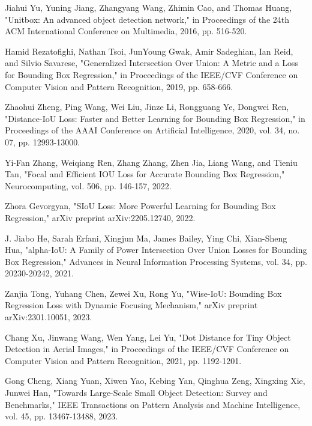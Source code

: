 \documentclass[lettersize,journal]{IEEEtran}
\begin{document}
\begin{thebibliography}{99}


 Jiahui Yu, Yuning Jiang, Zhangyang Wang, Zhimin Cao, and Thomas
Huang, "Unitbox: An advanced object detection network," in Proceedings of the 24th ACM International Conference on Multimedia, 2016, pp. 516-520.

Hamid Rezatofighi, Nathan Tsoi, JunYoung Gwak, Amir Sadeghian, Ian
Reid, and Silvio Savarese, "Generalized Intersection Over Union: A Metric and a Loss for Bounding Box Regression," in Proceedings of the IEEE/CVF Conference on Computer Vision and Pattern Recognition, 2019, pp. 658-666.

Zhaohui Zheng, Ping Wang, Wei Liu, Jinze Li, Rongguang Ye, Dongwei Ren, "Distance-IoU Loss: Faster and Better Learning for Bounding Box Regression," in Proceedings of the AAAI Conference on Artificial Intelligence, 2020, vol. 34, no. 07, pp. 12993-13000.

Yi-Fan Zhang, Weiqiang Ren, Zhang Zhang, Zhen Jia, Liang Wang,
and Tieniu Tan, "Focal and Efficient IOU Loss for Accurate Bounding Box Regression," Neurocomputing, vol. 506, pp. 146-157, 2022.

Zhora Gevorgyan, "SIoU Loss: More Powerful Learning for Bounding Box Regression," arXiv preprint arXiv:2205.12740, 2022.

J. Jiabo He, Sarah Erfani, Xingjun Ma, James Bailey, Ying Chi, Xian-Sheng Hua, "alpha-IoU: A Family of Power Intersection Over Union Losses for Bounding Box Regression," Advances in Neural Information Processing Systems, vol. 34, pp. 20230-20242, 2021.

Zanjia Tong, Yuhang Chen, Zewei Xu, Rong Yu, "Wise-IoU: Bounding Box Regression Loss with Dynamic Focusing Mechanism," arXiv preprint arXiv:2301.10051, 2023.

Chang Xu, Jinwang Wang, Wen Yang, Lei Yu, "Dot Distance for Tiny Object Detection in Aerial Images," in Proceedings of the IEEE/CVF Conference on Computer Vision and Pattern Recognition, 2021, pp. 1192-1201.

Gong Cheng, Xiang Yuan, Xiwen Yao, Kebing Yan, Qinghua Zeng, Xingxing Xie, Junwei Han, "Towards Large-Scale Small Object Detection: Survey and Benchmarks," IEEE Transactions on Pattern Analysis and Machine Intelligence, vol. 45, pp. 13467-13488, 2023.


\end{thebibliography}
\end{document}
